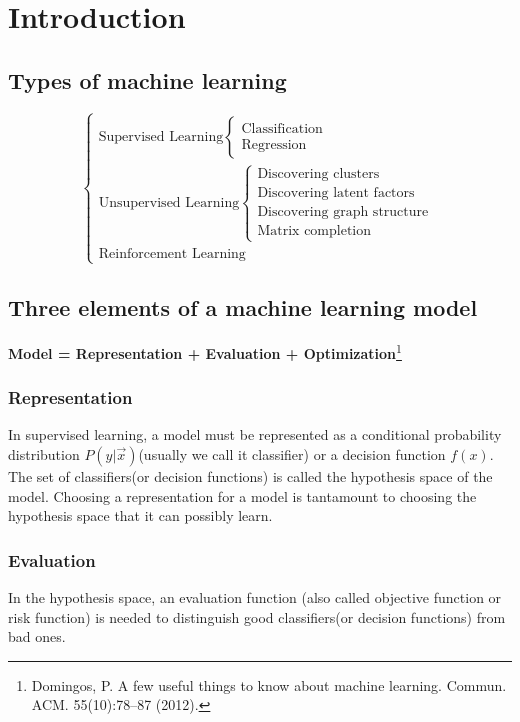 \chapter{Introduction}

\section{Types of machine learning}
\begin{equation}\nonumber
\begin{cases}
\text{Supervised Learning} \begin{cases} \text{Classification} \\ \text{Regression} \end{cases}\\
\text{Unsupervised Learning} \begin{cases} \text{Discovering clusters} \\ \text{Discovering latent factors} \\ \text{Discovering graph structure} \\ \text{Matrix completion} \end{cases}\\
\text{Reinforcement Learning}
\end{cases}
\end{equation}


\section{Three elements of a machine learning model}

\textbf{Model = Representation + Evaluation + Optimization}\footnote{Domingos, P. A few useful things to know about machine learning. Commun. ACM. 55(10):78–87 (2012).}


\subsection{Representation}
In supervised learning, a model must be represented as a conditional probability distribution $P(y|\vec{x})$(usually we call it classifier) or a decision function $f(x)$. The set of classifiers(or decision functions) is called the hypothesis space of the model. Choosing a representation for a model is tantamount to choosing the hypothesis space that it can possibly learn. 


\subsection{Evaluation}
In the hypothesis space, an evaluation function (also called objective function or risk function) is needed to distinguish good classifiers(or decision functions) from bad ones.


